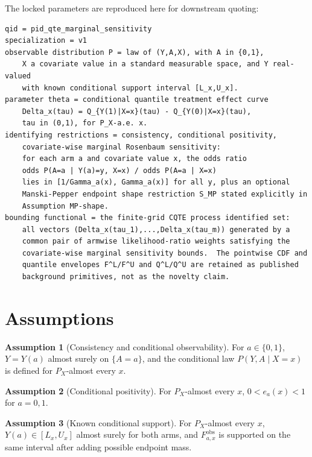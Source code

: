 \documentclass[11pt]{article}
\theoremstyle{definition}
\newtheorem{assumption}{Assumption}
\theoremstyle{plain}
\theoremstyle{remark}
\begin{document}
The locked parameters are reproduced here for downstream quoting:
\begin{verbatim}
qid = pid_qte_marginal_sensitivity
specialization = v1
observable distribution P = law of (Y,A,X), with A in {0,1},
    X a covariate value in a standard measurable space, and Y real-valued
    with known conditional support interval [L_x,U_x].
parameter theta = conditional quantile treatment effect curve
    Delta_x(tau) = Q_{Y(1)|X=x}(tau) - Q_{Y(0)|X=x}(tau),
    tau in (0,1), for P_X-a.e. x.
identifying restrictions = consistency, conditional positivity,
    covariate-wise marginal Rosenbaum sensitivity:
    for each arm a and covariate value x, the odds ratio
    odds P(A=a | Y(a)=y, X=x) / odds P(A=a | X=x)
    lies in [1/Gamma_a(x), Gamma_a(x)] for all y, plus an optional
    Manski-Pepper endpoint shape restriction S_MP stated explicitly in
    Assumption MP-shape.
bounding functional = the finite-grid CQTE process identified set:
    all vectors (Delta_x(tau_1),...,Delta_x(tau_m)) generated by a
    common pair of armwise likelihood-ratio weights satisfying the
    covariate-wise marginal sensitivity bounds.  The pointwise CDF and
    quantile envelopes F^L/F^U and Q^L/Q^U are retained as published
    background primitives, not as the novelty claim.
\end{verbatim}

\section{Assumptions}
\begin{assumption}[Consistency and conditional observability]\label{ass:consistency}
For \(a\in\{0,1\}\), \(Y=Y(a)\) almost surely on \(\{A=a\}\), and the conditional law \(P(Y,A\mid X=x)\) is defined for \(P_X\)-almost every \(x\).
\end{assumption}

\begin{assumption}[Conditional positivity]\label{ass:positivity}
For \(P_X\)-almost every \(x\), \(0<e_a(x)<1\) for \(a=0,1\).
\end{assumption}

\begin{assumption}[Known conditional support]\label{ass:support}
For \(P_X\)-almost every \(x\), \(Y(a)\in[L_x,U_x]\) almost surely for both arms, and \(F^{\mathrm{obs}}_{a,x}\) is supported on the same interval after adding possible endpoint mass.
\end{assumption}
\end{document}
